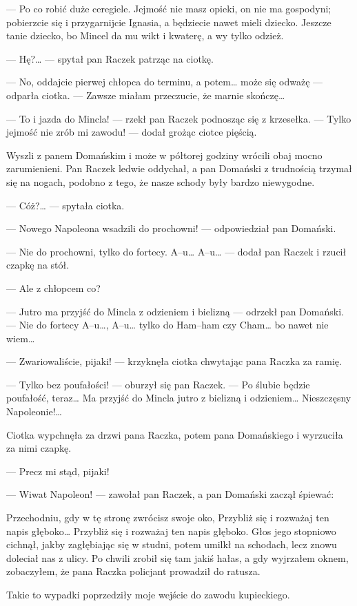 \documentclass{book}
\begin{document}
— Po co robić duże ceregiele. Jejmość nie masz opieki, on nie ma gospodyni; pobierzcie się i przygarnijcie Ignasia, a będziecie nawet mieli dziecko. Jeszcze tanie dziecko, bo Mincel da mu wikt i kwaterę, a wy tylko odzież.

— Hę?… — spytał pan Raczek patrząc na ciotkę.

— No, oddajcie pierwej chłopca do terminu, a potem… może się odważę — odparła ciotka. — Zawsze miałam przeczucie, że marnie skończę…

— To i jazda do Mincla! — rzekł pan Raczek podnosząc się z krzesełka. — Tylko jejmość nie zrób mi zawodu! — dodał grożąc ciotce pięścią.

Wyszli z panem Domańskim i może w półtorej godziny wrócili obaj mocno zarumienieni. Pan Raczek ledwie oddychał, a pan Domański z trudnością trzymał się na nogach, podobno z tego, że nasze schody były bardzo niewygodne.

— Cóż?… — spytała ciotka.

— Nowego Napoleona wsadzili do prochowni! — odpowiedział pan Domański.

— Nie do prochowni, tylko do fortecy. A–u… A–u… — dodał pan Raczek i rzucił czapkę na stół.

— Ale z chłopcem co?

— Jutro ma przyjść do Mincla z odzieniem i bielizną — odrzekł pan Domański. — Nie do fortecy A–u…, A–u… tylko do Ham–ham czy Cham… bo nawet nie wiem…

— Zwariowaliście, pijaki! — krzyknęła ciotka chwytając pana Raczka za ramię.

— Tylko bez poufałości! — oburzył się pan Raczek. — Po ślubie będzie poufałość, teraz… Ma przyjść do Mincla jutro z bielizną i odzieniem… Nieszczęsny Napoleonie!…

Ciotka wypchnęła za drzwi pana Raczka, potem pana Domańskiego i wyrzuciła za nimi czapkę.

— Precz mi stąd, pijaki!

— Wiwat Napoleon! — zawołał pan Raczek, a pan Domański zaczął śpiewać:

Przechodniu, gdy w tę stronę zwrócisz swoje oko,
Przybliż się i rozważaj ten napis głęboko…
Przybliż się i rozważaj ten napis głęboko. 
Głos jego stopniowo cichnął, jakby zagłębiając się w studni, potem umilkł na schodach, lecz znowu doleciał nas z ulicy. Po chwili zrobił się tam jakiś hałas, a gdy wyjrzałem oknem, zobaczyłem, że pana Raczka policjant prowadził do ratusza.

Takie to wypadki poprzedziły moje wejście do zawodu kupieckiego.
\end{document}

